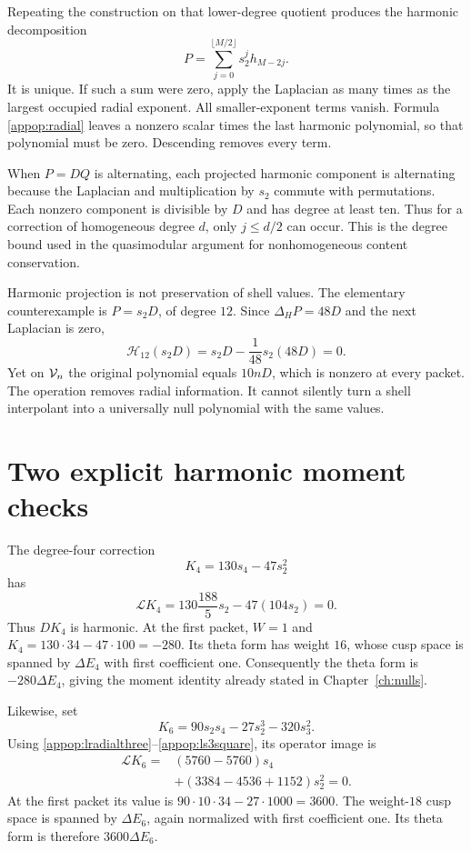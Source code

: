 Repeating the construction on that lower-degree quotient produces the harmonic decomposition
\begin{equation}\label{appop:decomposition}
P=\sum_{j=0}^{\lfloor M/2\rfloor}s_2^jh_{M-2j}.
\end{equation}
It is unique. If such a sum were zero, apply the Laplacian as many times as the largest occupied radial exponent. All smaller-exponent terms vanish. Formula \eqref{appop:radial} leaves a nonzero scalar times the last harmonic polynomial, so that polynomial must be zero. Descending removes every term.

When $P=DQ$ is alternating, each projected harmonic component is alternating because the Laplacian and multiplication by $s_2$ commute with permutations. Each nonzero component is divisible by $D$ and has degree at least ten. Thus for a correction of homogeneous degree $d$, only $j\le d/2$ can occur. This is the degree bound used in the quasimodular argument for nonhomogeneous content conservation.

Harmonic projection is not preservation of shell values. The elementary counterexample is $P=s_2D$, of degree $12$. Since $\Delta_HP=48D$ and the next Laplacian is zero,
\[
\mathcal H_{12}(s_2D)=s_2D-\frac1{48}s_2(48D)=0.
\]
Yet on $\mathcal V_n$ the original polynomial equals $10nD$, which is nonzero at every packet. The operation removes radial information. It cannot silently turn a shell interpolant into a universally null polynomial with the same values.

\section{Two explicit harmonic moment checks}
The degree-four correction
\[
K_4=130s_4-47s_2^2
\]
has
\[
\mathcal LK_4
=130\frac{188}{5}s_2-47(104s_2)=0.
\]
Thus $DK_4$ is harmonic. At the first packet, $W=1$ and $K_4=130\cdot34-47\cdot100=-280$. Its theta form has weight $16$, whose cusp space is spanned by $\Delta E_4$ with first coefficient one. Consequently the theta form is $-280\Delta E_4$, giving the moment identity already stated in Chapter~\ref{ch:nulls}.

Likewise, set
\[
K_6=90s_2s_4-27s_2^3-320s_3^2.
\]
Using \eqref{appop:lradialthree}--\eqref{appop:ls3square}, its operator image is
\begin{align*}
\mathcal LK_6={}&(5760-5760)s_4\\
&+(3384-4536+1152)s_2^2=0.
\end{align*}
At the first packet its value is $90\cdot10\cdot34-27\cdot1000=3600$. The weight-$18$ cusp space is spanned by $\Delta E_6$, again normalized with first coefficient one. Its theta form is therefore $3600\Delta E_6$.

